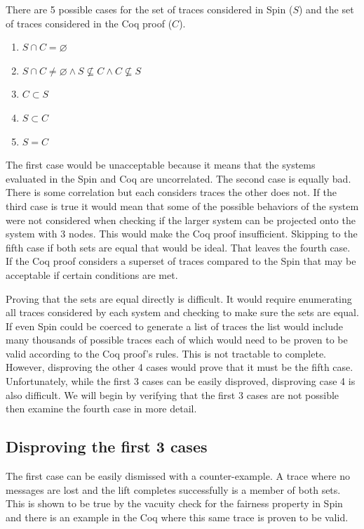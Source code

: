 \documentclass[runningheads]{llncs}
\begin{document}
There are 5 possible cases for the set of traces considered in Spin ($S$) and the set of traces considered in the Coq proof ($C$).
\begin{enumerate}
    \item $S \cap C = \varnothing$
    \item $S \cap C \neq \varnothing \wedge S \nsubseteq C \wedge C \nsubseteq S$
    \item $C \subset S$
    \item $S \subset C$
    \item $S = C$
\end{enumerate}

The first case would be unacceptable because it means that the systems evaluated in the Spin and Coq are uncorrelated. The second case is equally bad. There is some correlation but each considers traces the other does not. If the third case is true it would mean that some of the possible behaviors of the system were not considered when checking if the larger system can be projected onto the system with 3 nodes. This would make the Coq proof insufficient. Skipping to the fifth case if both sets are equal that would be ideal. 
That leaves the fourth case. If the Coq proof considers a superset of traces compared to the Spin that may be acceptable if certain conditions are met. 

Proving that the sets are equal directly is difficult. It would require enumerating all traces considered by each system and checking to make sure the sets are equal. If even Spin could be coerced to generate a list of traces the list would include many thousands of possible traces each of which would need to be proven to be valid according to the Coq proof's rules. This is not tractable to complete. However, disproving the other 4 cases would prove that it must be the fifth case. Unfortunately, while the first 3 cases can be easily disproved, disproving case 4 is also difficult. We will begin by verifying that the first 3 cases are not possible then examine the fourth case in more detail.


\subsection{Disproving the first 3 cases}
The first case can be easily dismissed with a counter-example. A trace where no messages are lost and the lift completes successfully is a member of both sets. This is shown to be true by the vacuity check for the fairness property in Spin and there is an example in the Coq where this same trace is proven to be valid.
\end{document}
